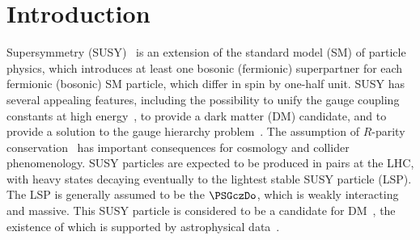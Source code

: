 \maketitle


\section{Introduction}
\label{sec:introduction}

Supersymmetry (SUSY)~\cite{ref:SUSY-1, ref:SUSY0, ref:SUSY3,
  ref:SUSY1} is an extension of the standard model (SM) of particle
physics, which introduces at least one bosonic (fermionic)
superpartner for each fermionic (bosonic) SM particle, which differ in
spin by one-half unit. 
SUSY has several appealing features, including the possibility to
unify the gauge coupling constants at high
energy~\cite{Dimopoulos:1981yj, Ibanez:1981yh, Marciano:1981un}, to
provide a dark matter (DM) candidate, and to provide a solution to the
gauge hierarchy problem~\cite{ref:hierarchy1, ref:hierarchy2}. The
assumption of $R$-parity conservation~\cite{Farrar:1978xj} has
important consequences for cosmology and collider phenomenology. SUSY
particles are expected to be produced in pairs at the LHC, with heavy
states decaying eventually to the lightest stable SUSY particle
(LSP). The LSP is generally assumed to be the $\PSGczDo$, which is
weakly interacting and massive. This SUSY particle is considered to be
a candidate for DM~\cite{Jungman:1995df}, the existence of which is
supported by astrophysical data~\cite{1674-1137-38-9-090001}. 

